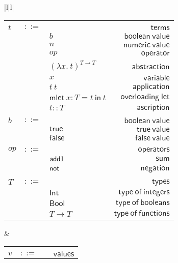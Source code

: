 \documentclass[preprint,authoryear,sort&compress,9pt,nocopyrightspace]{article}
\newcommand{\ascrip}[1]{#1::T}
\newcommand{\app}[2]{#1 \ #2}
\newcommand{\negacion}[1]{\mathsf{not} \ #1}
\newcommand{\suma}[1]{\mathsf{add1} \ #1}
\newcommand{\oletPT}[3]{\mathsf{mlet} \ x : #1 = #2 \ \mathsf{in}  \ #3}
\newcommand{\absSTT}[2]{(\lambda #1. \ #2)^{T \to T}}
\newcommand{\truet}{\mathsf{true}}
\newcommand{\falset}{\mathsf{false}}
\newcommand{\boolt}{\mathsf{Bool}}
\newcommand{\intt}{\mathsf{Int}}
\begin{document}
\setlength{\topmargin}{-25mm}
\setlength{\textheight}{230mm}
\begin{figure}
\begin{small}
\begin{center}
\hspace*{-2cm}
\begin{tabular}{|l|l|}
\hline
\begin{tabular}{l c l r}
&&&\\
$t$&$::=$&&$\mathsf {terms}$\\
&&$b$&$\mathsf {boolean \ value}$\\
&&$n$&$\mathsf {numeric \ value}$\\
&&$op$&$\mathsf{operator}$\\
&&$\absSTT {x}{t}$&\ $\mathsf {abstraction}$\\
&&$x$&$\mathsf {variable}$\\
&&$\app {t}{t}$&$\mathsf {application}$\\
&&$\oletPT{T}{t}{t}$&$\mathsf {overloading \ let}$\\
&&$\ascrip {t}$&$\mathsf {ascription}$\\
&&&\\
$b$&$::=$&&$\mathsf {boolean \ value}$\\
&&$\truet$&$\mathsf {true \ value}$\\
&&$\falset$&$\mathsf {false \ value}$\\
&&&\\
$op$&$::=$&&$\mathsf {operators}$\\
&&$\suma$&$\mathsf {sum}$\\
&&$\negacion$&$\mathsf{negation} $\\
&&&\\
$T$&$::=$&&$\mathsf {types}$\\
&&$\intt$&$\mathsf {type \ of \ integers}$\\
&&$\boolt$&$\mathsf {type \ of \ booleans}$\\
&&$T \to T$&$\mathsf {type \ of \ functions}$\\
\end{tabular}
& \begin{tabular}{l c l r}
&&&\\
$v$&$::=$&&$\mathsf {values}$\\

\end{tabular}
\end{tabular}
\end{center}
\end{small}
\end{figure}
\end{document}
